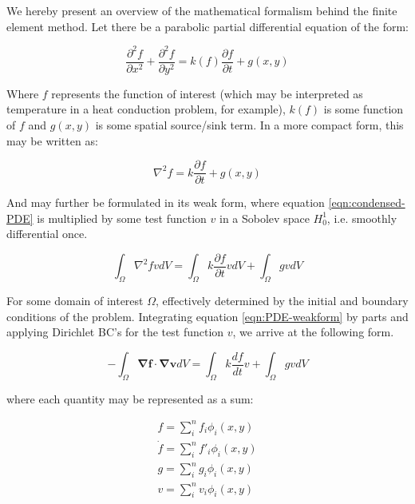 We hereby present an overview of the mathematical formalism behind the finite element method. Let there be a parabolic partial differential equation of the form:

\begin{equation}
\frac{\partial^2 f}{\partial x^2} + \frac{\partial^2 f}{\partial y^2} = k(f) \frac{\partial f}{\partial t} + g(x,y)
\end{equation}

Where $f$ represents the function of interest (which may be interpreted as temperature in a heat conduction problem, for example), $k(f)$ is some function of $f$ and $g(x,y)$ is some spatial source/sink term. In a more compact form, this may be written as:

\begin{equation}
\nabla^2 f  = k\frac{\partial f}{\partial t} + g(x,y) \label{eqn:condensed-PDE}
\end{equation}

And may further be formulated in its weak form, where equation \ref{eqn:condensed-PDE} is multiplied by some test function $v$ in a Sobolev space $H_0^1$, i.e. smoothly differential once.

\begin{equation}
\int_\Omega \nabla^2 f v dV = \int_\Omega k \frac{\partial f}{\partial t}v dV + \int_\Omega gv dV \label{eqn:PDE-weakform}
\end{equation}

For some domain of interest $\Omega$, effectively determined by the initial and boundary conditions of the problem. Integrating equation \ref{eqn:PDE-weakform} by parts and applying Dirichlet BC's for the test function $v$, we arrive at the following form.

\begin{equation}
- \int_\Omega \mathbf{\nabla f} \cdot \mathbf{\nabla v} dV = \int_\Omega k \frac{df}{dt} v + \int_\Omega gv dV
\end{equation}

where each quantity may be represented as a sum:

\begin{align}
f = \sum_i^n f_i \phi_i(x,y) \nonumber \\
\dot{f} =  \sum_i^n f'_i \phi_i(x,y) \nonumber \\
g = \sum_i^n g_i \phi_i(x,y) \nonumber \\
v = \sum_i^n v_i \phi_i(x,y) \nonumber
\end{align}

